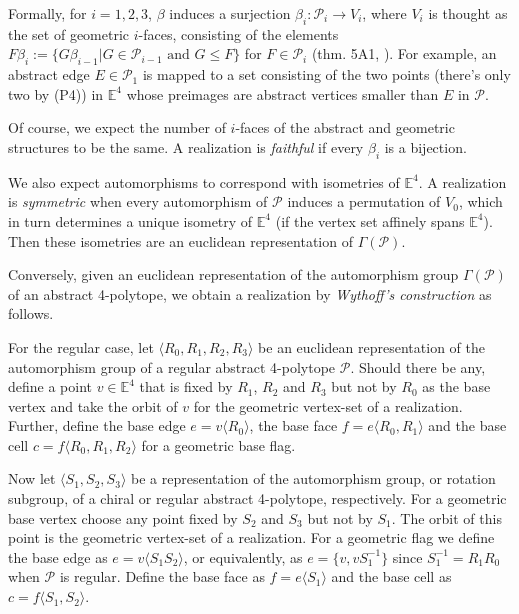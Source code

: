 \documentclass{article}
\theoremstyle{definition}
\newcommand{\E}{\mathbb{E}}
\newcommand{\p}{\mathcal{P}}
\begin{document}
	Formally, for $i=1,2,3$, $\beta$ induces a surjection $\beta_i:\p_i\to V_i$, where $V_i$ is thought as the set of geometric $i$-faces, consisting of the elements ${F\beta_i:=\{G\beta_{i-1}|G\in\p_{i-1}\text{ and }G\leq F\}}$ for $F\in\p_i$ (thm. 5A1, \cite{abstract-polytopes}). For example, an abstract edge $E\in\p_1$ is mapped to a set consisting of the two points (there's only two by (P4)) in $\E^4$ whose preimages are abstract vertices smaller than $E$ in $\p$.

	

	Of course, we expect the number of $i$-faces of the abstract and geometric structures to be the same. A realization is \textit{faithful} if every $\beta_i$ is a bijection.
	
	We also expect automorphisms to correspond with isometries of $\E^4$. A realization is \textit{symmetric} when every automorphism of $\p$ induces a permutation of $V_0$, which in turn determines a unique isometry of $\E^4$ (if the vertex set affinely spans $\E^4$). Then these isometries are an euclidean representation of $\Gamma(\p)$.
	
	Conversely, given an euclidean representation of the automorphism group $\Gamma(\p)$ of an abstract 4-polytope, we obtain a realization by \textit{Wythoff's construction} as follows.
	
	For the regular case, let $\langle R_0, R_1,R_2,R_3\rangle$ be an euclidean representation of the automorphism group of a regular abstract 4-polytope $\p$. Should there be any, define a point $v\in\E^4$ that is fixed by $R_1$, $R_2$ and $R_3$ but not by $R_0$ as the base vertex and take the orbit of $v$ for the geometric vertex-set of a realization. Further, define the base edge $e=v\langle R_0\rangle$, the base face $f=e\langle R_0,R_1\rangle$ and the base cell $c=f\langle R_0,R_1,R_2\rangle$ for a geometric base flag.
	
	Now let $\langle S_1,S_2,S_3\rangle$ be a representation of the automorphism group, or rotation subgroup, of a chiral or regular abstract 4-polytope, respectively. For a geometric base vertex choose any point fixed by $S_2$ and $S_3$ but not by $S_1$. The orbit of this point is the geometric vertex-set of a realization. For a geometric flag we define the base edge as $e=v\langle S_1S_2\rangle$, or equivalently, as $e=\{v,vS_1^{-1}\}$ since $S_1^{-1}=R_1R_0$ when $\p$ is regular. Define the base face as $f=e\langle S_1\rangle$ and the base cell as $c=f\langle S_1,S_2\rangle$.
	
\end{document}
